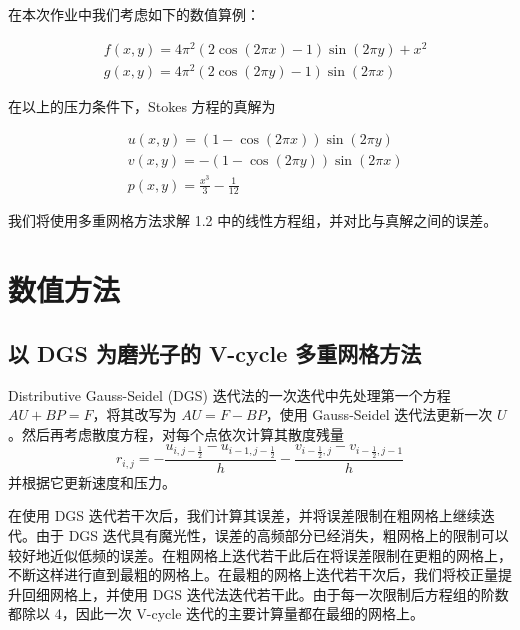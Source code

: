\documentclass{article}
\begin{document}
在本次作业中我们考虑如下的数值算例：

\begin{equation*}
    \begin{aligned}
        & f(x,y)=4\pi^2(2\cos(2\pi x)-1)\sin(2\pi y)+x^2 \\
        & g(x,y)=4\pi^2(2\cos(2\pi y)-1)\sin(2\pi x)
    \end{aligned}
\end{equation*}

在以上的压力条件下，Stokes 方程的真解为

\begin{equation*}
    \begin{aligned}
        & u(x,y)=(1-\cos(2\pi x))\sin(2\pi y) \\
        & v(x,y)=-(1-\cos(2\pi y))\sin(2\pi x) \\
        & p(x,y)=\frac{x^3}{3} - \frac{1}{12}
    \end{aligned}
\end{equation*}

我们将使用多重网格方法求解 1.2 中的线性方程组，并对比与真解之间的误差。

\section{数值方法}

\subsection{以 DGS 为磨光子的 V-cycle 多重网格方法}

Distributive Gauss-Seidel (DGS) 迭代法的一次迭代中先处理第一个方程 $AU+BP=F$，将其改写为 $AU=F-BP$，使用 Gauss-Seidel 迭代法更新一次 $U$。然后再考虑散度方程，对每个点依次计算其散度残量
\begin{equation*}
    r_{i,j} = -\frac{u_{i,j-\frac{1}{2}}-u_{i-1,j-\frac{1}{2}}}{h} - \frac{v_{i-\frac{1}{2},j}-v_{i-\frac{1}{2},j-1}}{h}
\end{equation*}
并根据它更新速度和压力。

在使用 DGS 迭代若干次后，我们计算其误差，并将误差限制在粗网格上继续迭代。由于 DGS 迭代具有魔光性，误差的高频部分已经消失，粗网格上的限制可以较好地近似低频的误差。在粗网格上迭代若干此后在将误差限制在更粗的网格上，不断这样进行直到最粗的网格上。在最粗的网格上迭代若干次后，我们将校正量提升回细网格上，并使用 DGS 迭代法迭代若干此。由于每一次限制后方程组的阶数都除以 4，因此一次 V-cycle 迭代的主要计算量都在最细的网格上。
\end{document}
